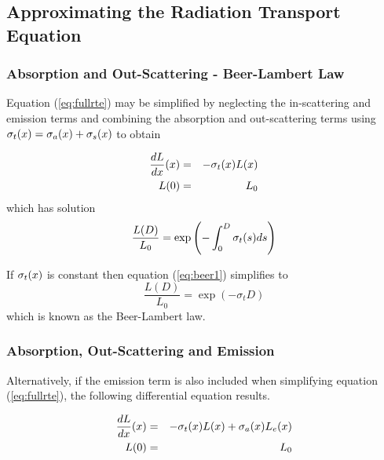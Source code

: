 %
%

\subsection{Approximating the Radiation Transport Equation}

%
%

\subsubsection{Absorption and Out-Scattering - Beer-Lambert Law}
Equation (\ref{eq:fullrte}) may be simplified by neglecting the
in-scattering and emission terms and combining the absorption and
out-scattering terms using $\sigma_t(x)=\sigma_a(x)+\sigma_s(x)$ to obtain

\begin{eqnarray*}
\frac{dL}{dx}(x)&=&-\sigma_t(x) L(x)\\
L(0)&=&L_0
\end{eqnarray*}
which has solution
\begin{equation}
\label{eq:beer1} \frac{L(D)}{L_0}=\exp\left({-\int_0^D \sigma_t(s) ds}\right)
\end{equation}

If $\sigma_t(x)$ is constant then equation (\ref{eq:beer1}) simplifies
to
\begin{equation}
\label{eq:beer2} \frac{L(D)}{L_0}=\exp(-\sigma_t D)
\end{equation}
which is known as the Beer-Lambert law\cite{}.

%
%

\subsubsection{Absorption, Out-Scattering and Emission}
Alternatively, if the emission term is also included when
simplifying equation (\ref{eq:fullrte}),  the following
differential equation results.

\begin{eqnarray}
\label{eq:simple_rte}
\frac{dL}{dx}(x)&=&-\sigma_t(x) L(x) + \sigma_a(x) L_e(x)\\
 L(0)&=&L_0\nonumber
\end{eqnarray}


